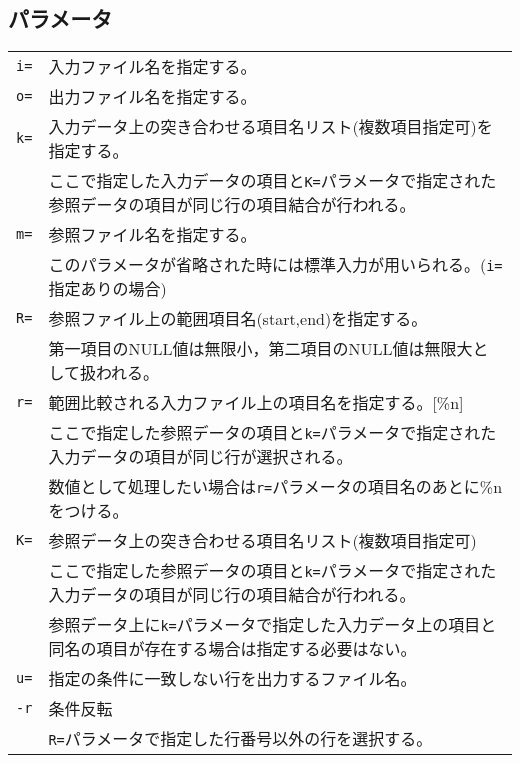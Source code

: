 \subsection*{パラメータ}
\begin{table}[htbp]
{\small
\begin{tabular}{ll}
\verb|i=|    & 入力ファイル名を指定する。\\
\verb|o=|    & 出力ファイル名を指定する。\\
\verb|k=|    & 入力データ上の突き合わせる項目名リスト(複数項目指定可)を指定する。\\
             & ここで指定した入力データの項目と\verb|K=|パラメータで指定された参照データの項目が同じ行の項目結合が行われる。\\
\verb|m=|    & 参照ファイル名を指定する。\\
             & このパラメータが省略された時には標準入力が用いられる。(\verb|i=|指定ありの場合)\\
\verb|R=|    & 参照ファイル上の範囲項目名(start,end)を指定する。\\
             & 第一項目のNULL値は無限小，第二項目のNULL値は無限大として扱われる。\\
\verb|r=|    & 範囲比較される入力ファイル上の項目名を指定する。[\%{n}]\\
             & ここで指定した参照データの項目と\verb|k=|パラメータで指定された入力データの項目が同じ行が選択される。\\
             & 数値として処理したい場合は\verb|r=|パラメータの項目名のあとに\%nをつける。\\
\verb|K=|    & 参照データ上の突き合わせる項目名リスト(複数項目指定可)\\
             & ここで指定した参照データの項目と\verb|k=|パラメータで指定された入力データの項目が同じ行の項目結合が行われる。\\
             & 参照データ上に\verb|k=|パラメータで指定した入力データ上の項目と同名の項目が存在する場合は指定する必要はない。\\
\verb|u=|    & 指定の条件に一致しない行を出力するファイル名。\\
\verb|-r|    & 条件反転\\
             & \verb|R=|パラメータで指定した行番号以外の行を選択する。\\
\end{tabular} 
}
\end{table} 

